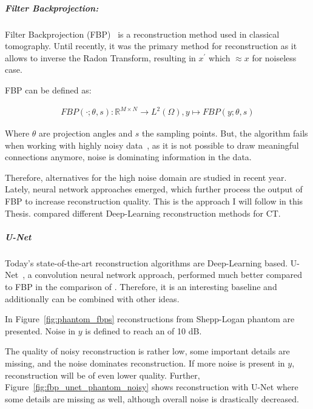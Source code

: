 \subparagraph{Filter Backprojection:}
Filter Backprojection (FBP)~\cite{tomographicReconstruction} is a reconstruction method used in classical tomography.
Until recently, it was the primary method for reconstruction as it allows to inverse the Radon Transform, resulting in 
$x^{\prime}$ which $ \approx x$ for noiseless case. 

FBP can be defined as:

\begin{equation}
    \label{eq:fbp}
    \begin{aligned}
        \textit{FBP}(\cdot; \theta, s) : \mathbb{R}^{M \times N} \to L^2(\Omega), y \mapsto \textit{FBP}(y; \theta, s)
    \end{aligned}
\end{equation}

Where $\theta$ are projection angles and $s$ the sampling points.
But, the algorithm fails when working with highly noisy data~\cite{cryoEmMath2}, as it is not possible to draw meaningful connections anymore, noise
is dominating information in the data.

Therefore, alternatives for the high noise domain are studied in recent year.
Lately, neural network approaches emerged, which further process the output of FBP to increase reconstruction quality.
This is the approach I will follow in this Thesis. \citet{ct-reconstruction-comparison} compared different 
Deep-Learning reconstruction methods for CT. 

\subparagraph{U-Net}
Today's state-of-the-art reconstruction algorithms are Deep-Learning based.
U-Net~\cite{unet-tomography}, a convolution neural network approach, performed
much better compared to FBP in the comparison of \citet{ct-reconstruction-comparison}.
Therefore, it is an interesting baseline and additionally can be combined with other ideas.

In Figure~\ref{fig:phantom_fbps} reconstructions from Shepp-Logan phantom are presented.
Noise in $y$ is defined to reach an \snry of 10 dB.

The quality of noisy reconstruction is rather low, some important details are missing, and the noise dominates reconstruction.
If more noise is present in $y$, reconstruction will be of even lower quality.
Further, Figure~\ref{fig:fbp_unet_phantom_noisy} 
shows reconstruction with U-Net where some details are missing as well, although overall noise is drastically decreased.



